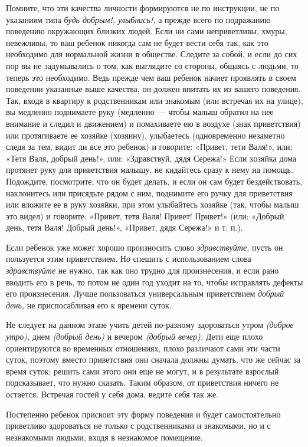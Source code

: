 \documentclass[a5paper]{book}
\renewcommand{\emph}[1]{\textit{#1}}
\begin{document}
Помните, что эти качества личности формируются не по инструкции, не по
указаниям типа \emph{будь добрым!, улыбнись!,} а прежде всего по
подражанию поведению окружающих близких людей. Если ни сами
неприветливы, хмуры, невежливы, то ваш ребенок никогда сам не будет
вести себя так, как это необходимо для нормальной жизни в обществе.
Следите за собой, и если до сих пор вы не задумывались о том, как
выглядите со стороны, общаясь с людьми, то теперь это необходимо. Ведь
прежде чем ваш ребенок начнет проявлять в своем поведении указанные выше
качества, он должен впитать их из вашего поведения. Так, входя в
квартиру к родственникам или знакомым (или встречая их на улице), вы
медленно поднимаете руку (медленно --- чтобы малыш обратил на нее
внимание и следил и движением) и помахиваете ею в воздухе (знак
приветствия) или протягиваете ее хозяйке (хозяину), улыбаетесь
(одновременно незаметно следя за тем, видит ли все это ребенок) и
говорите: «Привет, тети Валя!», или: «Тетя Валя, добрый день!», или:
«Здравствуй, дядя Сережа!» Если хозяйка дома протянет руку для
приветствия малышу, не кидайтесь сразу к нему на помощь. Подождите,
посмотрите, что он будет делать, и если он сам будет бездействовать,
наклонитесь или присядьте рядом с ним, поднимите его ручку для
приветствия или вложите ее в руку хозяйки, при этом улыбайтесь хозяйке
(так, чтобы малыш это видел) и говорите: «Привет, тетя Валя! Привет!
Привет!» (или: «Добрый день, тетя Валя! Добрый день!», «Привет, дядя
Сережа!» и т. п.).

Если ребенок уже может хорошо произносить слово \emph{здравствуйте,}
пусть он пользуется этим приветствием. Но спешить с использованием слова
\emph{здравствуйте} не нужно, так как оно трудно для произнесения, и
если рано вводить его в речь, то потом не один год уходит на то, чтобы
исправлять дефекты его произнесения. Лучше пользоваться универсальным
приветствием \emph{добрый день,} не приспосабливая его к времени суток.

Не \textbf{с}ледуе\textbf{т} на данном этапе учить детей по-разному
здороваться утром \emph{(доброе утро),} днем \emph{(добрый день)} и
вечером \emph{(добрый вечер).} Дети еще плохо ориентируются во временных
отношениях, плохо различают сами эти части суток, поэтому вместо
приветствия они сначала должны думать, что же сейчас за время суток;
решить сами этого они еще не могут, и в результате взрослый
подсказывает, что нужно сказать. Таким образом, от приветствия ничего не
остается. Встречая гостей у себя дома, ведите себя так же.

Постепенно ребенок присвоит эту форму поведения и будет самостоятельно
приветливо здороваться не только с родственниками и знакомыми, но и с
незнакомыми людьми, входя в незнакомое помещение.
\end{document}
